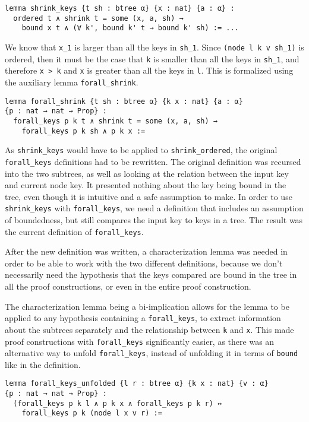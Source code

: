 \begin{lstlisting}
lemma shrink_keys {t sh : btree α} {x : nat} {a : α} :
  ordered t ∧ shrink t = some (x, a, sh) → 
    bound x t ∧ (∀ k', bound k' t → bound k' sh) := ...
\end{lstlisting}

We know that \lstinline{x_1} is larger than all the keys in \lstinline{sh_1}. Since \lstinline{(node l k v sh_1)} is ordered, then it must be the case that \lstinline{k} is smaller than all the keys in \lstinline{sh_1}, and therefore \lstinline{x > k} and \lstinline{x} is greater than all the keys in \lstinline{l}. This is formalized using the auxiliary lemma \lstinline{forall_shrink}.

\begin{lstlisting}
lemma forall_shrink {t sh : btree α} {k x : nat} {a : α} 
{p : nat → nat → Prop} :
  forall_keys p k t ∧ shrink t = some (x, a, sh) → 
    forall_keys p k sh ∧ p k x :=
\end{lstlisting}

As \lstinline{shrink_keys} would have to be applied to \lstinline{shrink_ordered}, the original \lstinline{forall_keys} definitions had to be rewritten. The original definition was recursed into the two subtrees, as well as looking at the relation between the input key and current node key. It presented nothing about the key being bound in the tree, even though it is intuitive and a safe assumption to make. In order to use \lstinline{shrink_keys} with \lstinline{forall_keys}, we need a definition that includes an assumption of boundedness, but still compares the input key to keys in a tree. The result was the current definition of \lstinline{forall_keys}.

After the new definition was written, a characterization lemma was needed in order to be able to work with the two different definitions, because we don't necessarily need the hypothesis that the keys compared are bound in the tree in all the proof constructions, or even in the entire proof construction.

The characterization lemma being a bi-implication allows for the lemma to be applied to any hypothesis containing a \lstinline{forall_keys}, to extract information about the subtrees separately and the relationship between \lstinline{k} and \lstinline{x}. This made proof constructions with \lstinline{forall_keys} significantly easier, as there was an alternative way to unfold \lstinline{forall_keys}, instead of unfolding it in terms of \lstinline{bound} like in the definition. 

\begin{lstlisting}
lemma forall_keys_unfolded {l r : btree α} {k x : nat} {v : α} 
{p : nat → nat → Prop} :
  (forall_keys p k l ∧ p k x ∧ forall_keys p k r) ↔ 
    forall_keys p k (node l x v r) :=
\end{lstlisting}